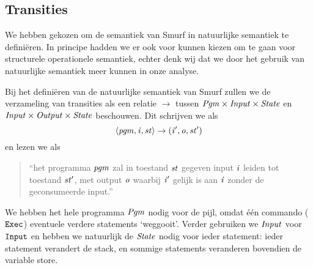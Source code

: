 \subsection{Transities}
\label{sec:def:trans}
We hebben gekozen om de semantiek van Smurf in natuurlijke semantiek te definiëren. In principe hadden we er ook voor kunnen kiezen om te gaan voor structurele operationele semantiek, echter denk wij dat we door het gebruik van natuurlijke semantiek meer kunnen in onze analyse. 

Bij het definiëren van de natuurlijke semantiek van Smurf zullen we de
verzameling van transities als een relatie $\to$ tussen
$\mathit{Pgm}\times\mathit{Input}\times\mathit{State}$ en $\mathit{Input}\times\mathit{Output}\times\mathit{State}$ beschouwen.
Dit schrijven we als
$$\left\langle\mathit{pgm},\mathit{i},\mathit{st}\right\rangle\to\left(\mathit{i}',\mathit{o},\mathit{st}'\right)$$
en lezen we als
\begin{quote}
	``het programma $\mathit{pgm}$ zal in toestand $\mathit{st}$ gegeven input $\mathit{i}$ leiden tot
	toestand $\mathit{st}'$, met output $\mathit{o}$ waarbij $\mathit{i}'$ gelijk is aan $\mathit{i}$ zonder
	de geconsumeerde input.''
\end{quote}

We hebben het hele programma $\mathit{Pgm}$ nodig voor de pijl, omdat één commando
($\texttt{Exec}$) eventuele verdere statements `weggooit'. %
Verder gebruiken we $\mathit{Input}$ voor $\texttt{Input}$ en hebben we natuurlijk de
$\mathit{State}$ nodig voor ieder statement: ieder statement verandert de stack, en
sommige statements veranderen bovendien de variable store.


